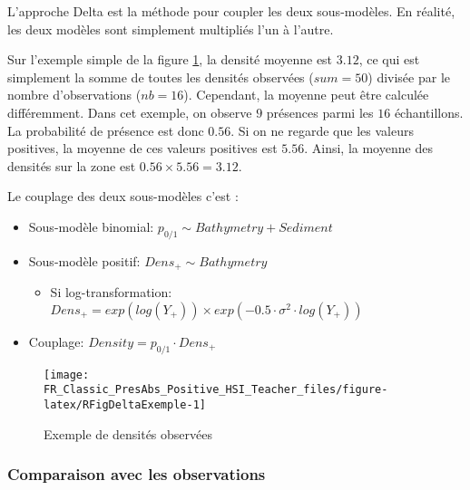 \documentclass[french,a4paper]{article}
\providecommand{\tightlist}{%
  \setlength{\itemsep}{0pt}\setlength{\parskip}{0pt}}
\begin{document}
L'approche Delta est la méthode pour coupler les deux sous-modèles. En réalité, les deux modèles sont simplement multipliés l'un à l'autre.

Sur l'exemple simple de la figure \ref{fig:RFigDeltaExemple}, la densité moyenne est \(3.12\), ce qui est simplement la somme de toutes les densités observées (\(sum = 50\)) divisée par le nombre d'observations (\(nb = 16\)). Cependant, la moyenne peut être calculée différemment. Dans cet exemple, on observe \(9\) présences parmi les \(16\) échantillons. La probabilité de présence est donc \(0.56\). Si on ne regarde que les valeurs positives, la moyenne de ces valeurs positives est \(5.56\). Ainsi, la moyenne des densités sur la zone est \(0.56 \times 5.56 = 3.12\).



Le couplage des deux sous-modèles c'est :

\begin{itemize}
\tightlist
\item
  Sous-modèle binomial: \(p_{0/1} \sim Bathymetry + Sediment\)
\item
  Sous-modèle positif: \(Dens_{+} \sim Bathymetry\)

  \begin{itemize}
  \tightlist
  \item
    Si log-transformation: \(Dens_{+} = exp(log(Y_{+})) \times exp(-0.5 \cdot \sigma^{2} \cdot log(Y_{+}))\)
  \end{itemize}
\item
  Couplage: \(Density = p_{0/1} \cdot Dens_{+}\)
\end{itemize}

\begin{figure}[!h]

{\centering \texttt{[image: FR\_Classic\_PresAbs\_Positive\_HSI\_Teacher\_files/figure-latex/RFigDeltaExemple-1]} 

}

\caption{Exemple de densités observées}\label{fig:RFigDeltaExemple}
\end{figure}

\hypertarget{comparaison-avec-les-observations}{%
\subsubsection{Comparaison avec les observations}\label{comparaison-avec-les-observations}}
\end{document}
